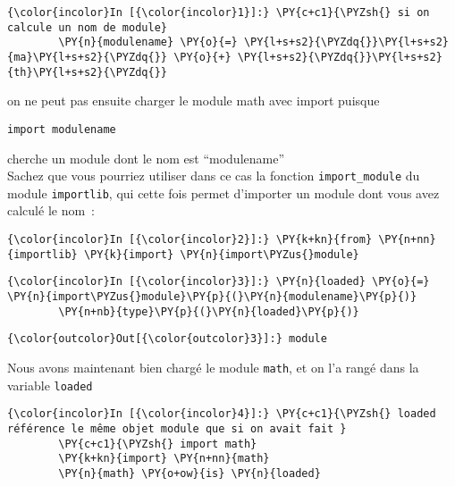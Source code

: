     \begin{Verbatim}[commandchars=\\\{\}]
{\color{incolor}In [{\color{incolor}1}]:} \PY{c+c1}{\PYZsh{} si on calcule un nom de module}
        \PY{n}{modulename} \PY{o}{=} \PY{l+s+s2}{\PYZdq{}}\PY{l+s+s2}{ma}\PY{l+s+s2}{\PYZdq{}} \PY{o}{+} \PY{l+s+s2}{\PYZdq{}}\PY{l+s+s2}{th}\PY{l+s+s2}{\PYZdq{}} 
\end{Verbatim}


    on ne peut pas ensuite charger le module math avec import puisque

\begin{verbatim}
import modulename
\end{verbatim}

cherche un module dont le nom est ``modulename''\\

    Sachez que vous pourriez utiliser dans ce cas la fonction
\texttt{import\_module} du module \texttt{importlib}, qui cette fois
permet d'importer un module dont vous avez calculé le nom~:

    \begin{Verbatim}[commandchars=\\\{\}]
{\color{incolor}In [{\color{incolor}2}]:} \PY{k+kn}{from} \PY{n+nn}{importlib} \PY{k}{import} \PY{n}{import\PYZus{}module}
\end{Verbatim}


    \begin{Verbatim}[commandchars=\\\{\}]
{\color{incolor}In [{\color{incolor}3}]:} \PY{n}{loaded} \PY{o}{=} \PY{n}{import\PYZus{}module}\PY{p}{(}\PY{n}{modulename}\PY{p}{)}
        \PY{n+nb}{type}\PY{p}{(}\PY{n}{loaded}\PY{p}{)}
\end{Verbatim}


\begin{Verbatim}[commandchars=\\\{\}]
{\color{outcolor}Out[{\color{outcolor}3}]:} module
\end{Verbatim}
            
    Nous avons maintenant bien chargé le module \texttt{math}, et on l'a
rangé dans la variable \texttt{loaded}

    \begin{Verbatim}[commandchars=\\\{\}]
{\color{incolor}In [{\color{incolor}4}]:} \PY{c+c1}{\PYZsh{} loaded référence le même objet module que si on avait fait }
        \PY{c+c1}{\PYZsh{} import math}
        \PY{k+kn}{import} \PY{n+nn}{math}
        \PY{n}{math} \PY{o+ow}{is} \PY{n}{loaded}
\end{Verbatim}


